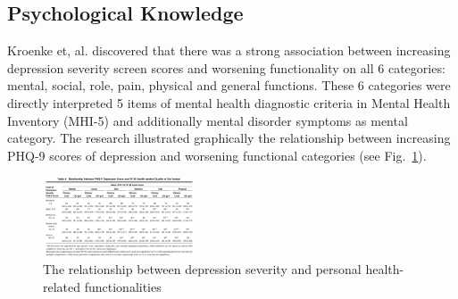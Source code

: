 \documentclass[10pt,journal,compsoc]{IEEEtran}
\begin{document}
\subsection{Psychological Knowledge}
Kroenke et, al. \cite{Kroenke} discovered that there was a strong association between increasing depression severity screen scores and worsening functionality on all 6 categories: mental, social, role, pain, physical and general functions. These 6 categories were directly interpreted 5 items of mental health diagnostic criteria in Mental Health Inventory (MHI-5) and additionally mental disorder symptoms as mental category. The research illustrated graphically the relationship between increasing PHQ-9 scores of depression and worsening functional categories (see Fig.~\ref{fig2}). 
\begin{figure}[h]
\centering
\includegraphics[width=0.4\textwidth]{phq-9.png}
\caption{The relationship between depression severity and personal health-related functionalities\cite{Kroenke}} \label{fig2}
\end{figure}
\end{document}
